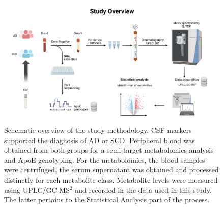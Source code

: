 \documentclass{amsart}
\begin{document}
\begin{figure}[h]
  \includegraphics[width=\textwidth]{figures/metabolomics.png}
    \caption{Schematic overview of the study methodology. CSF markers supported the diagnosis of AD or SCD. Peripheral blood was obtained from both groups for a semi-target metabolomics analysis and ApoE genotyping. For the metabolomics, the blood samples were centrifuged, the serum supernatant was obtained and processed distinctly for each metabolite class. Metabolite levels were measured using UPLC/GC-MS$^2$ and recorded in the data used in this study. The latter pertains to the Statistical Analysis part of the process.}
  \label{metabolomics}
\end{figure}
\end{document}
